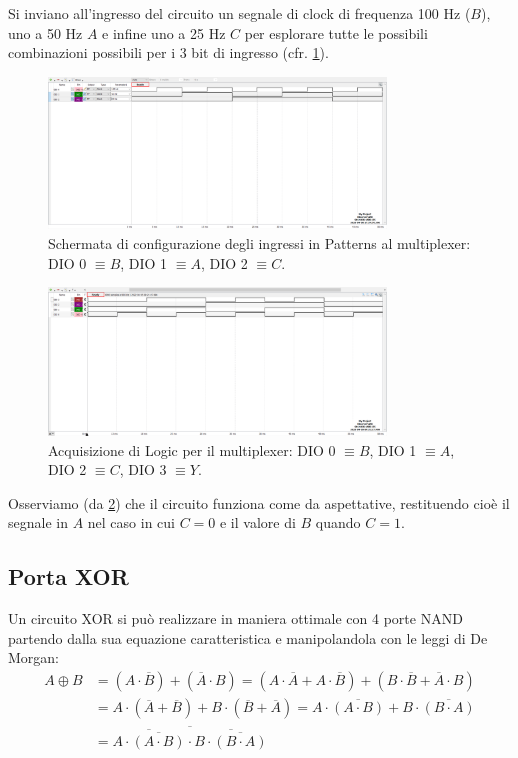 \documentclass[10pt, a4paper, italian]{article}
\begin{document}
Si inviano all'ingresso del circuito un segnale di clock di frequenza 100 Hz
($B$), uno a 50 Hz $A$ e infine uno a 25 Hz $C$ per esplorare tutte le
possibili combinazioni possibili per i 3 bit di ingresso
(cfr. \cref{fig: mult_pat}).
\begin{figure}[htbp]
    \centering
    \includegraphics[width=0.8\textwidth]{pat2}
    \caption{Schermata di configurazione degli ingressi in Patterns
    al multiplexer: DIO 0 $\equiv B$, DIO 1 $\equiv A$, DIO 2 $\equiv C$.
    \label{fig: mult_pat}}
\end{figure}
\begin{figure}[htbp]
    \centering
    \includegraphics[width=0.8\textwidth]{Multiplex}
    \caption{Acquisizione di Logic per il multiplexer: DIO 0 $\equiv B$,
    DIO 1 $\equiv A$, DIO 2 $\equiv C$, DIO 3 $\equiv Y$.}
    \label{fig: mult_log}
\end{figure}
Osserviamo (da \cref{fig: mult_log}) che il circuito funziona come da
aspettative, restituendo cioè il segnale in $A$ nel caso in cui $C = 0$ e
il valore di $B$ quando $C = 1$.

\subsection{Porta XOR}
Un circuito XOR si può realizzare in maniera ottimale con 4 porte NAND
partendo dalla sua equazione caratteristica e manipolandola con le leggi di
De Morgan:
\begin{align*}
  A \oplus B &= (A \cdot \overline{B}) + (\overline{A} \cdot B) = 
 (A \cdot \overline{A} + A \cdot \overline{B}) + (B \cdot \overline{B} +
 \overline{A} \cdot B) \\
 &= A \cdot (\overline{A} + \overline{B}) + B \cdot (\overline{B} +
 \overline{A}) = A \cdot \overline{(A \cdot B)} +
 B \cdot \overline{(B \cdot A)} \\
 &= \overline{\overline{A \cdot \overline{(A \cdot B)}} \cdot
 \overline{B \cdot \overline{(B \cdot A)}}}
\end{align*}
\end{document}
